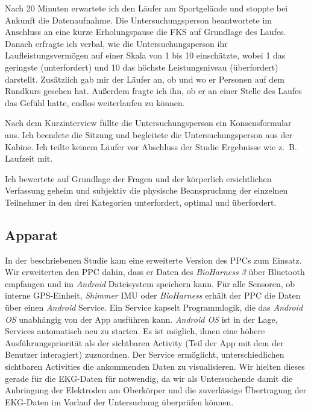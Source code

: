 Nach 20 Minuten erwartete ich den Läufer am Sportgelände und stoppte bei Ankunft die Datenaufnahme. Die Untersuchungsperson beantwortete im Anschluss an eine kurze Erholungspause die \ac{FKS} auf Grundlage des Laufes. Danach erfragte ich verbal, wie die Untersuchungsperson ihr Laufleistungsvermögen auf einer Skala von 1 bis 10 einschätzte, wobei 1 das geringste (unterfordert) und 10 das höchste Leistungsniveau (überfordert) darstellt. Zusätzlich gab mir der Läufer an, ob und wo er Personen auf dem Rundkurs gesehen hat. Außerdem fragte ich ihn, ob er an einer Stelle des Laufes das Gefühl hatte, endlos weiterlaufen zu können. 

Nach dem Kurzinterview füllte die Untersuchungsperson ein Konsensformular aus. Ich beendete die Sitzung und begleitete die Untersuchungsperson aus der Kabine. Ich teilte keinem Läufer vor Abschluss der Studie Ergebnisse wie z.~B. Laufzeit mit. 

Ich bewertete auf Grundlage der Fragen und der körperlich ersichtlichen Verfassung geheim und subjektiv die physische Beanspruchung der einzelnen Teilnehmer in den drei Kategorien unterfordert, optimal und überfordert.

\subsection{Apparat}
In der beschriebenen Studie kam eine erweiterte Version des \ac{PPC}s zum Einsatz. Wir erweiterten den \ac{PPC} dahin, dass er Daten des \emph{BioHarness 3} über Bluetooth empfangen und im \emph{Android} Dateisystem speichern kann. Für alle Sensoren, ob interne \ac{GPS}-Einheit, \emph{Shimmer} \ac{IMU} oder \emph{BioHarness} erhält der \ac{PPC} die Daten über einen \emph{Android} Service. Ein Service kapselt Programmlogik, die das \emph{Android OS} unabhängig von der App ausführen kann. \emph{Android OS} ist in der Lage, Services automatisch neu zu starten. Es ist möglich, ihnen eine höhere Ausführungspriorität als der sichtbaren Activity (Teil der App mit dem der Benutzer interagiert) zuzuordnen. Der Service ermöglicht, unterschiedlichen sichtbaren Activities die ankommenden Daten zu visualisieren. Wir hielten dieses gerade für die \ac{EKG}-Daten für notwendig, da wir als Untersuchende damit die Anbringung der Elektroden am Oberkörper und die zuverlässige Übertragung der \ac{EKG}-Daten im Vorlauf der Untersuchung überprüfen können. 

